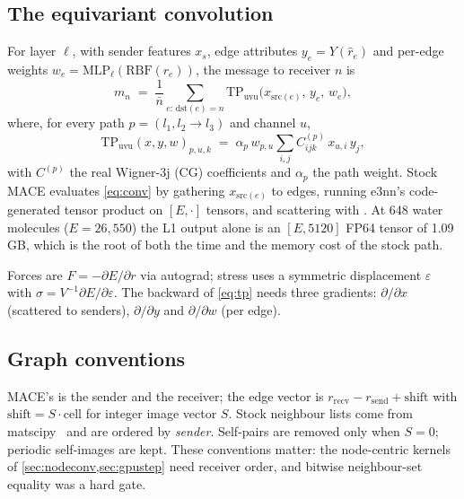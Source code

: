 \subsection{The equivariant convolution}
For layer $\ell$, with sender features $x_{s}$, edge attributes $y_e = Y(\hat r_e)$ and per-edge weights $w_e = \mathrm{MLP}_\ell(\mathrm{RBF}(r_e))$, the message to receiver $n$ is
\begin{equation}
  m_n \;=\; \frac{1}{\bar n}\sum_{e:\,\mathrm{dst}(e)=n} \mathrm{TP}_{\text{uvu}}\bigl(x_{\mathrm{src}(e)},\, y_e,\, w_e\bigr),
  \label{eq:conv}
\end{equation}
where, for every path $p=(l_1,l_2\to l_3)$ and channel $u$,
\begin{equation}
  \mathrm{TP}_{\text{uvu}}(x,y,w)_{p,u,k} \;=\; \alpha_p\, w_{p,u} \sum_{i,j} C^{(p)}_{ijk}\, x_{u,i}\, y_j ,
  \label{eq:tp}
\end{equation}
with $C^{(p)}$ the real Wigner-3j (CG) coefficients and $\alpha_p$ the path weight. Stock MACE evaluates \cref{eq:conv} by gathering $x_{\mathrm{src}(e)}$ to edges, running e3nn's code-generated tensor product on $[E,\cdot]$ tensors, and scattering with . At 648 water molecules ($E=26{,}550$) the L1 output alone is an $[E,5120]$ FP64 tensor of 1.09\,GB, which is the root of both the time and the memory cost of the stock path.

Forces are $F=-\partial E/\partial r$ via autograd; stress uses a symmetric displacement $\varepsilon$ with $\sigma=V^{-1}\partial E/\partial\varepsilon$. The backward of \cref{eq:tp} needs three gradients: $\partial/\partial x$ (scattered to senders), $\partial/\partial y$ and $\partial/\partial w$ (per edge).

\subsection{Graph conventions}
MACE's  is the sender and  the receiver; the edge vector is $r_{\mathrm{recv}}-r_{\mathrm{send}}+\text{shift}$ with $\text{shift}=S\cdot\text{cell}$ for integer image vector $S$. Stock neighbour lists come from matscipy~\cite{matscipy} and are ordered by \emph{sender}. Self-pairs are removed only when $S=0$; periodic self-images are kept. These conventions matter: the node-centric kernels of \cref{sec:nodeconv,sec:gpustep} need receiver order, and bitwise neighbour-set equality was a hard gate.
